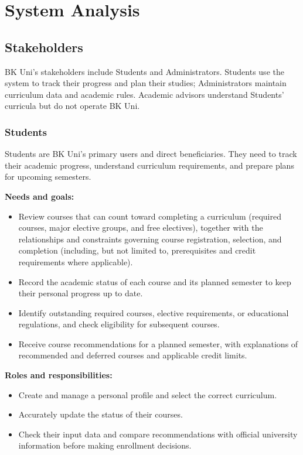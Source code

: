 \section{System Analysis}
\label{sec:sys-analysis}
\subsection{Stakeholders}

BK Uni's stakeholders include Students and Administrators. Students use the system to track their progress and plan their studies; Administrators maintain curriculum data and academic rules. Academic advisors understand Students' curricula but do not operate BK Uni.

\subsubsection{Students}
Students are BK Uni's primary users and direct beneficiaries. They need to track their academic progress, understand curriculum requirements, and prepare plans for upcoming semesters.

\textbf{Needs and goals:}
\begin{itemize}
    \item Review courses that can count toward completing a curriculum (required courses, major elective groups, and free electives), together with the relationships and constraints governing course registration, selection, and completion (including, but not limited to, prerequisites and credit requirements where applicable).
    \item Record the academic status of each course and its planned semester to keep their personal progress up to date.
    \item Identify outstanding required courses, elective requirements, or educational regulations, and check eligibility for subsequent courses.
    \item Receive course recommendations for a planned semester, with explanations of recommended and deferred courses and applicable credit limits.
\end{itemize}

\textbf{Roles and responsibilities:}
\begin{itemize}
    \item Create and manage a personal profile and select the correct curriculum.
    \item Accurately update the status of their courses.
    \item Check their input data and compare recommendations with official university information before making enrollment decisions.
\end{itemize}


